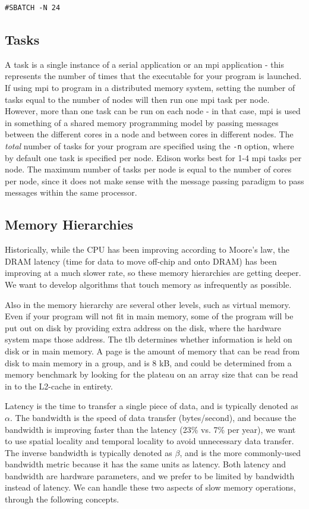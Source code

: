 \documentclass[10pt]{article}
\begin{document}
\begin{flushleft}
\begin{lstlisting}
#SBATCH -N 24
\end{lstlisting}

\subsection{Tasks}
A task is a single instance of a serial application or an \gls{mpi} application - this represents the number of times that the executable for your program is launched. If using \gls{mpi} to program in a distributed memory system, setting the number of tasks equal to the number of nodes will then run one \gls{mpi} task per node. However, more than one task can be run on each node - in that case, \gls{mpi} is used in something of a shared memory programming model by passing messages between the different cores in a node and between cores in different nodes. The \textit{total} number of tasks for your program are specified using the {\tt -n} option, where by default one task is specified per node. Edison works best for 1-4 \gls{mpi} tasks per node. The maximum number of tasks per node is equal to the number of cores per node, since it does not make sense with the message passing paradigm to pass messages within the same processor. 

\subsection{Memory Hierarchies}

Historically, while the CPU has been improving according to Moore's law, the DRAM latency (time for data to move off-chip and onto DRAM) has been improving at a much slower rate, so these memory hierarchies are getting deeper. We want to develop algorithms that touch memory as infrequently as possible. 

Also in the memory hierarchy are several other levels, such as virtual memory. Even if your program will not fit in main memory, some of the program will be put out on disk by providing extra address on the disk, where the hardware system maps those address. The \gls{tlb} determines whether information is held on disk or in main memory. A page is the amount of memory that can be read from disk to main memory in a group, and is 8 kB, and could be determined from a memory benchmark by looking for the plateau on an array size that can be read in to the L2-cache in entirety.

Latency is the time to transfer a single piece of data, and is typically denoted as \(\alpha\). The bandwidth is the speed of data transfer (bytes/second), and because the bandwidth is improving faster than the latency (23\% vs. 7\% per year), we want to use spatial locality and temporal locality to avoid unnecessary data transfer. The inverse bandwidth is typically denoted as \(\beta\), and is the more commonly-used bandwidth metric because it has the same units as latency. Both latency and bandwidth are hardware parameters, and we prefer to be limited by bandwidth instead of latency. We can handle these two aspects of slow memory operations, through the following concepts.


\end{flushleft}
\end{document}
